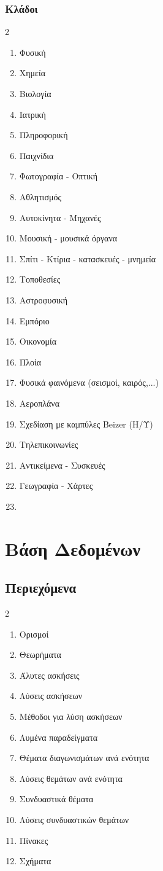 \documentclass[11pt,a4paper]{book}
\begin{document}
\subsection{Κλάδοι}
\begin{multicols}{2}
\begin{enumerate}
\item Φυσική
\item Χημεία
\item Βιολογία
\item Ιατρική
\item Πληροφορική
\item Παιχνίδια
\item Φωτογραφία - Οπτική
\item Αθλητισμός
\item Αυτοκίνητα - Μηχανές
\item Μουσική - μουσικά όργανα
\item Σπίτι - Κτίρια - κατασκευές - μνημεία
\item Τοποθεσίες
\item Αστροφυσική
\item Εμπόριο
\item Οικονομία
\item Πλοία
\item Φυσικά φαινόμενα (σεισμοί, καιρός,...)
\item Αεροπλάνα
\item Σχεδίαση με καμπύλες Beizer (Η/Υ)
\item Τηλεπικοινωνίες
\item Αντικείμενα - Συσκευές
\item Γεωγραφία - Χάρτες
\item 
\end{enumerate}
\end{multicols}
\chapter{Βάση Δεδομένων}
\section{Περιεχόμενα}
\begin{multicols}{2}
\begin{enumerate}[itemsep=0mm]
\item Ορισμοί
\item Θεωρήματα
\item Άλυτες ασκήσεις
\item Λύσεις ασκήσεων
\item Μέθοδοι για λύση ασκήσεων
\item Λυμένα παραδείγματα
\item Θέματα διαγωνισμάτων ανά ενότητα
\item Λύσεις θεμάτων ανά ενότητα
\item Συνδυαστικά θέματα
\item Λύσεις συνδυαστικών θεμάτων
\item Πίνακες
\item Σχήματα
\end{enumerate}
\end{multicols}
\end{document}
